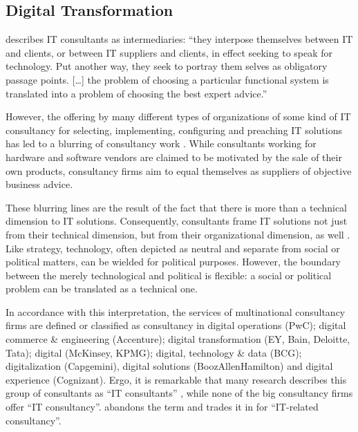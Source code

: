 \documentclass[12pt]{article}
\begin{document}
\subsection{Digital Transformation}\label{digital-transformation}

\citet[28]{bloomfield1995} describes IT consultants as intermediaries:
``they interpose themselves between IT and clients, or between IT
suppliers and clients, in effect seeking to speak for technology. Put
another way, they seek to portray them selves as obligatory passage
points. {[}\ldots{]} the problem of choosing a particular functional
system is translated into a problem of choosing the best expert
advice.''

However, the offering by many different types of organizations of some
kind of IT consultancy for selecting, implementing, configuring and
preaching IT solutions has led to a blurring of consultancy work
\citetext{\citealp[ 31]{bloomfield1995}; \citealp[ 162]{kipping2012}}.
While consultants working for hardware and software vendors are claimed
to be motivated by the sale of their own products, consultancy firms aim
to equal themselves as suppliers of objective business advice.

These blurring lines are the result of the fact that there is more than
a technical dimension to IT solutions. Consequently, consultants frame
IT solutions not just from their technical dimension, but from their
organizational dimension, as well \citep[ 24-25]{bloomfield1995}. Like
strategy, technology, often depicted as neutral and separate from social
or political matters, can be wielded for political purposes. However,
the boundary between the merely technological and political is flexible:
a social or political problem can be translated as a technical one.

In accordance with this interpretation, the services of multinational
consultancy firms are defined or classified as consultancy in digital
operations (PwC); digital commerce \& engineering (Accenture); digital
transformation (EY, Bain, Deloitte, Tata); digital (McKinsey, KPMG);
digital, technology \& data (BCG); digitalization (Capgemini), digital
solutions (BoozAllenHamilton) and digital experience (Cognizant). Ergo,
it is remarkable that many research describes this group of consultants
as ``IT consultants''
\citep{nevo2007, loh1992, fincham2006, armbruster2006, bloomfield1995, schwarz2005},
while none of the big consultancy firms offer ``IT consultancy''.
\citet[96]{czerniawska1999} abandons the term and trades it in for
``IT-related consultancy''.
\end{document}

